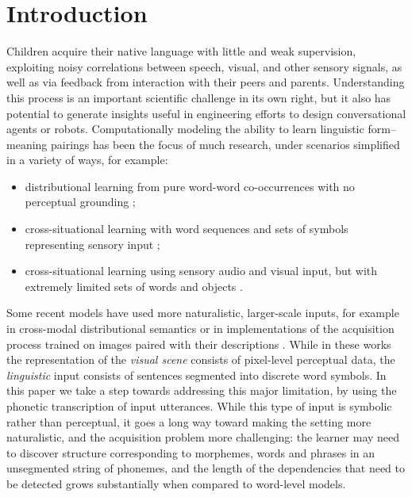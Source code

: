 \section{Introduction}
\label{sec:intro}
Children acquire their native language with little and weak
supervision, exploiting noisy correlations between speech, visual, and
other sensory signals, as well as via feedback from interaction with
their peers and parents. Understanding this process is an important
scientific challenge in its own right, but it also has potential to
generate insights useful in engineering efforts to design
conversational agents or robots. Computationally modeling the ability
to learn linguistic form--meaning pairings has been the focus of much
research, under scenarios simplified in a variety of ways, for
example:

\begin{itemize}
\item distributional learning from pure word-word co-occurrences with
  no perceptual grounding \cite{landauer1998introduction,kiros2015skip};
\item cross-situational learning with word sequences and sets of
  symbols representing sensory input
  \cite{siskind.96,fazly.etal.10csj};
\item cross-situational learning using sensory audio and visual
  input, but with extremely limited sets of words and objects
  \cite{Roy2002113,iwahashi2003language}.
\end{itemize}

Some recent models have used more naturalistic, larger-scale inputs,
for example in cross-modal distributional semantics
\cite{lazaridou2015combining} or in implementations of the acquisition
process trained on images paired with their descriptions
\cite{chrupala2015learning}. While in these works the representation
of the {\it visual scene} consists of pixel-level perceptual data, the
{\it linguistic} input consists of sentences segmented into discrete
word symbols. In this paper we take a step towards addressing this
major limitation, by using the phonetic transcription of input
utterances. While this type of input is symbolic rather than
perceptual, it goes a long way toward making the setting more
naturalistic, and the acquisition problem more challenging: the
learner may need to discover structure corresponding to morphemes, words
and phrases in an unsegmented string of phonemes, and the length of
the dependencies that need to be detected grows substantially when
compared to word-level models.

